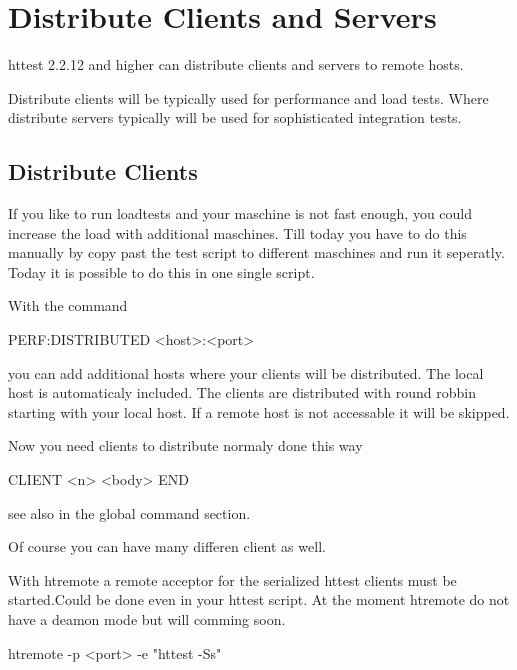 \chapter{Distribute Clients and Servers}
\label{chap:distributed}

httest 2.2.12 and higher can distribute clients and servers to remote hosts. 

Distribute clients will be typically used for performance and load tests. Where
distribute servers typically will be used for sophisticated integration tests.


\section{Distribute Clients}
\label{chap:distributeClients}

If you like to run loadtests and your maschine is not fast enough, you could
increase the load with additional maschines. Till today you have to do this manually
by copy past the test script to different maschines and run it seperatly.
Today it is possible to do this in one single script.

With the command

\begin{usplisting}
  PERF:DISTRIBUTED <host>:<port>
\end{usplisting}

you can add additional hosts where your clients will be distributed. The local host 
is automaticaly included. The clients are distributed with round robbin starting with
your local host. If a remote host is not accessable it will be skipped.

Now you need clients to distribute normaly done this way

\begin{usplisting}
  CLIENT <n>
  <body>
  END
\end{usplisting}

see also in the global command section.

Of course you can have many differen client as well.

With htremote a remote acceptor for the serialized httest clients must be started.Could
be done even in your httest script. At the moment htremote do not have a deamon mode but
will comming soon.

\begin{usplisting}
  htremote -p <port> -e "httest -Ss"
\end{usplisting}

